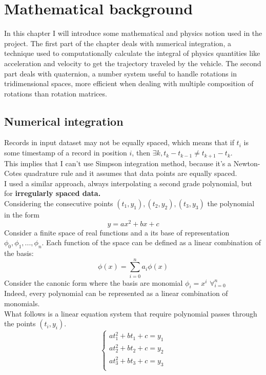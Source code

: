 \chapter{Mathematical background}
\label{chap:math_background}

In this chapter I will introduce some mathematical and physics notion used in the project.
The first part of the chapter deals with numerical integration, a technique used to computationally calculate the integral of physics quantities like acceleration and velocity to get the trajectory traveled by the vehicle.
The second part deals with quaternion, a number system useful to handle rotations in tridimensional spaces, more efficient when dealing with multiple composition of rotations than rotation matrices.
\\
\section{Numerical integration}
Records in input dataset may not be equally spaced, which means that if $t_i$ is some timestamp of a record in position $i$, then $\exists k, t_{k}-t_{k-1}\neq t_{k+1}-t_k$. \\
This implies that I can't use Simpson integration method, because it's a Newton-Cotes quadrature rule and it assumes that data points are equally spaced. \cite{casciola} \\
I used a similar approach, always interpolating a second grade polynomial, but for \textbf{irregularly spaced data.} \cite{integrating-irregularly} \\
Considering the consecutive points $(t_1,y_1),(t_2,y_2),(t_3,y_3)$
the polynomial in the form
$$y=ax^2+bx+c$$
Consider a finite space of real functions and a its base of representation $\phi_0,\phi_1,...,\phi_n$.
Each function of the space can be defined as a linear combination of the basis:
$$ \phi(x) = \sum_{i=0}^n a_i \phi (x)$$ 
Consider the canonic form where the basis are monomial $\phi_i=x^i$ $\forall_{i=0}^n$ \\
Indeed, every polynomial can be represented as a linear combination of monomials. \\
What follows is a linear equation system that require polynomial passes through the points $(t_i,y_i)$.
$$
\begin{cases}
at_1^2 + bt_1 + c = y_1 \\
at_2^2 + bt_2 + c = y_2 \\
at_3^2 + bt_3 + c = y_3 \\
\end{cases}
$$
